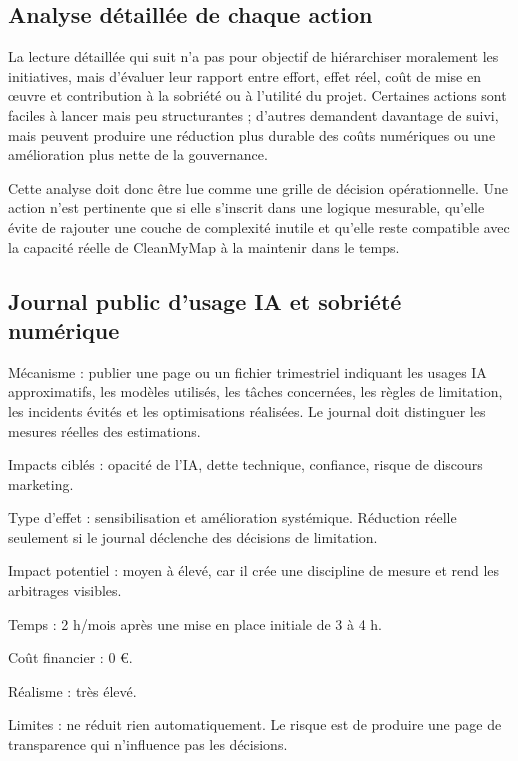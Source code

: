 \documentclass[
  10pt,
  a4paper,
  DIV=11,
  numbers=noendperiod,
  oneside]{scrreprt}
\begin{document}
\subsection{Analyse détaillée de chaque
action}\label{analyse-duxe9tailluxe9e-de-chaque-action}

La lecture détaillée qui suit n'a pas pour objectif de hiérarchiser
moralement les initiatives, mais d'évaluer leur rapport entre effort,
effet réel, coût de mise en œuvre et contribution à la sobriété ou à
l'utilité du projet. Certaines actions sont faciles à lancer mais peu
structurantes ; d'autres demandent davantage de suivi, mais peuvent
produire une réduction plus durable des coûts numériques ou une
amélioration plus nette de la gouvernance.

Cette analyse doit donc être lue comme une grille de décision
opérationnelle. Une action n'est pertinente que si elle s'inscrit dans
une logique mesurable, qu'elle évite de rajouter une couche de
complexité inutile et qu'elle reste compatible avec la capacité réelle
de CleanMyMap à la maintenir dans le temps.

\subsection{Journal public d'usage IA et sobriété
numérique}\label{journal-public-dusage-ia-et-sobriuxe9tuxe9-numuxe9rique}

Mécanisme : publier une page ou un fichier trimestriel indiquant les
usages IA approximatifs, les modèles utilisés, les tâches concernées,
les règles de limitation, les incidents évités et les optimisations
réalisées. Le journal doit distinguer les mesures réelles des
estimations.

Impacts ciblés : opacité de l'IA, dette technique, confiance, risque de
discours marketing.

Type d'effet : sensibilisation et amélioration systémique. Réduction
réelle seulement si le journal déclenche des décisions de limitation.

Impact potentiel : moyen à élevé, car il crée une discipline de mesure
et rend les arbitrages visibles.

Temps : 2 h/mois après une mise en place initiale de 3 à 4 h.

Coût financier : 0 €.

Réalisme : très élevé.

Limites : ne réduit rien automatiquement. Le risque est de produire une
page de transparence qui n'influence pas les décisions.
\end{document}
